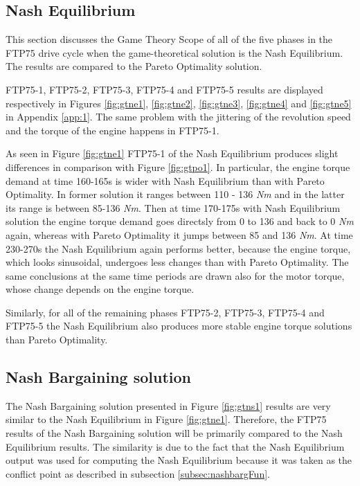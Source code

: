 \subsection{Nash Equilibrium}
This section discusses the Game Theory Scope of all of the five phases in the FTP75 drive cycle when the game-theoretical solution is the Nash Equilibrium. The results are compared to the Pareto Optimality solution.

FTP75-1, FTP75-2, FTP75-3, FTP75-4 and FTP75-5 results are displayed respectively in Figures \ref{fig:gtne1}, \ref{fig:gtne2}, \ref{fig:gtne3}, \ref{fig:gtne4} and \ref{fig:gtne5} in Appendix \ref{app:1}. The same problem with the jittering of the revolution speed and the torque of the engine happens in FTP75-1.

As seen in Figure \ref{fig:gtne1} FTP75-1 of the Nash Equilibrium produces slight differences in comparison with Figure \ref{fig:gtpo1}. In particular, the engine torque demand at time 160-165s is wider with Nash Equilibrium than with Pareto Optimality. In former solution it ranges between 110 - 136 \textit{Nm} and in the latter its range is between 85-136 \textit{Nm}. Then at time 170-175s with Nash Equilibrium solution the engine torque demand goes directsly from 0 to 136 and back to 0 \textit{Nm} again, whereas with Pareto Optimality it jumps between 85 and 136 \textit{Nm}. At time 230-270s the Nash Equilibrium again performs better, because the engine torque, which looks sinusoidal, undergoes less changes than with Pareto Optimality. The same conclusions at the same time periods are drawn also for the motor torque, whose change depends on the engine torque.

Similarly, for all of the remaining phases FTP75-2, FTP75-3, FTP75-4 and FTP75-5 the Nash Equilibrium also produces more stable engine torque solutions than Pareto Optimality.

\subsection{Nash Bargaining solution}
The Nash Bargaining solution presented in Figure \ref{fig:gtns1} results are very similar to the Nash Equilibrium in Figure \ref{fig:gtne1}. Therefore, the FTP75 results of the Nash Bargaining solution will be primarily compared to the Nash Equilibrium results. The similarity is due to the fact that the Nash Equilibrium output was used for computing the Nash Equilibrium because it was taken as the conflict point as described in subsection \ref{subsec:nashbargFun}.

